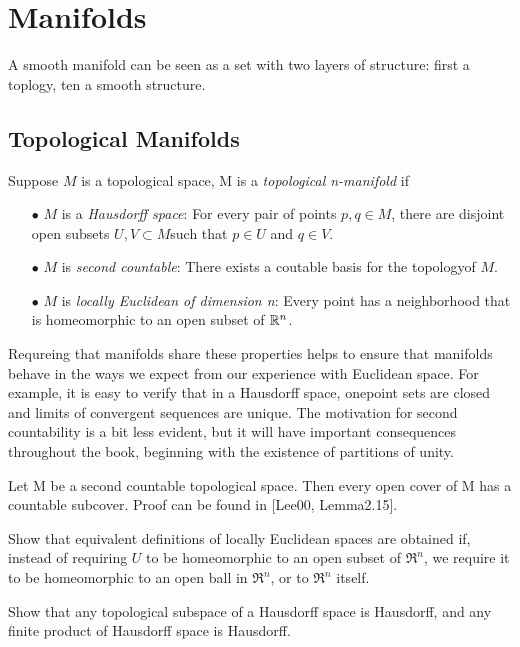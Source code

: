 \chapter{Manifolds}
A smooth manifold can be seen as a set with two layers of structure: first a toplogy,
ten a smooth structure.

\section{Topological Manifolds}
\begin{definition} 
Suppose $M$ is a topological space, M is a \emph{topological n-manifold} if
\begin{enumerate}
\item[$\bullet$] $M$ is a \emph{Hausdorff space}: For every pair of points $p,q \in M$, 
there are disjoint open subsets $U,V\subset M$such that $p\in U$ and $q\in V$.
\item[$\bullet$] $M$ is \emph{second countable}: There exists a coutable basis for 
the topologyof $M$.
\item[$\bullet$] $M$ is \emph{locally Euclidean of dimension n}: Every point has a 
neighborhood that is homeomorphic to an open subset of $\mathbb{R}^n$. 
\end{enumerate}
\end{definition}
Requreing that manifolds share these properties helps to ensure that manifolds behave
in the ways we expect from our experience with Euclidean space. For example, it is easy
to verify that in a Hausdorff space, onepoint sets are closed and limits of convergent
sequences are unique. The motivation for second countability is a bit less evident, 
but it will have important consequences throughout the book, beginning with the existence
of partitions of unity.
\begin{lem}
Let M be a second countable topological space. Then every open cover of M has a countable
subcover. Proof can be found in [Lee00, Lemma2.15].
\end{lem}
\begin{exer}
Show that equivalent definitions of locally Euclidean spaces are obtained if, instead of
requiring $U$ to be homeomorphic to an open subset of $\Re^n$, we require it to be homeomorphic
to an open ball in $\Re^n$, or to $\Re^n$ itself.
\end{exer}
\begin{exer}
Show that any topological subspace of a Hausdorff space is Hausdorff, and any finite product of
Hausdorff space is Hausdorff.
\end{exer}
